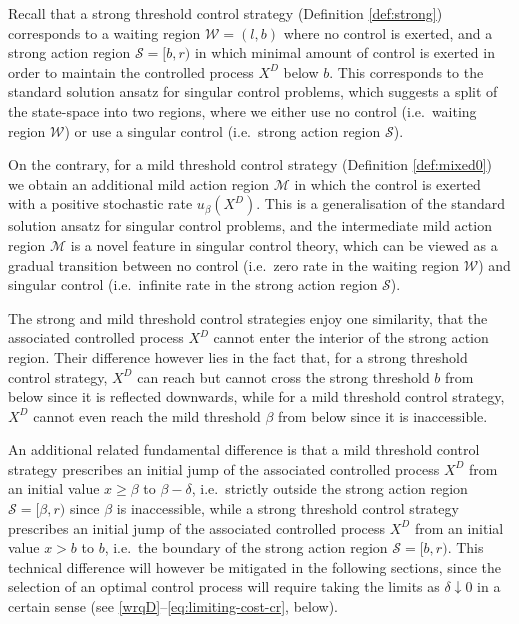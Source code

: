 \documentclass[11pt]{article} %
\numberwithin{komcounter}{section}
\begin{document}
Recall that a strong threshold control strategy (Definition \ref{def:strong}) corresponds to a waiting region $\mathcal{W}= (l,b)$ where no control is exerted, and a strong action region $\mathcal{S}=[b,r)$ in which minimal amount of control is exerted in order to maintain the controlled process $X^D$ below $b$. 
This corresponds to the standard solution ansatz for singular control problems, which suggests a split of the state-space into two regions, where we either use no control (i.e.~waiting region $\mathcal{W}$) or use a singular control (i.e.~strong action region $\mathcal{S}$).

On the contrary, for a mild threshold control strategy (Definition \ref{def:mixed0}) we obtain an additional mild action region $\mathcal M$ in which the control is exerted with a positive stochastic rate $u_\beta(X^D)$. 
This is a generalisation of the standard solution ansatz for singular control problems, and the intermediate mild action region $\mathcal{M}$ is a novel feature in singular control theory, which can be viewed as a gradual transition between no control (i.e.~zero rate in the waiting region $\mathcal{W}$) and singular control (i.e.~infinite rate in the strong action region $\mathcal{S}$).    

The strong and mild threshold control strategies enjoy one similarity, that the associated controlled process $X^D$ cannot enter the interior of the strong action region. 
Their difference however lies in the fact that, for a strong threshold control strategy, $X^D$ can reach but cannot cross the strong threshold $b$ from below since it is reflected downwards, while for a mild threshold control strategy, $X^D$ cannot even reach the mild threshold $\beta$ from below since it is inaccessible. 

An additional related fundamental difference is that 
a mild threshold control strategy prescribes an initial jump of the associated controlled process $X^D$ from an initial value $x\geq \beta$ to $\beta-\delta$, i.e.~strictly outside the strong action region $\mathcal{S}=[\beta,r)$ since $\beta$ is inaccessible, 
while a strong threshold control strategy prescribes an initial jump of the associated controlled process $X^D$ from an initial value $x>b$ to $b$, i.e.~the boundary of the strong action region $\mathcal{S}=[b,r)$. 
This technical difference will however be mitigated in the following sections, since the selection of an optimal control process will require taking the limits as $\delta \downarrow 0$ in a certain sense (see \eqref{wrqD}--\eqref{eq:limiting-cost-cr}, below).   
\end{document}
